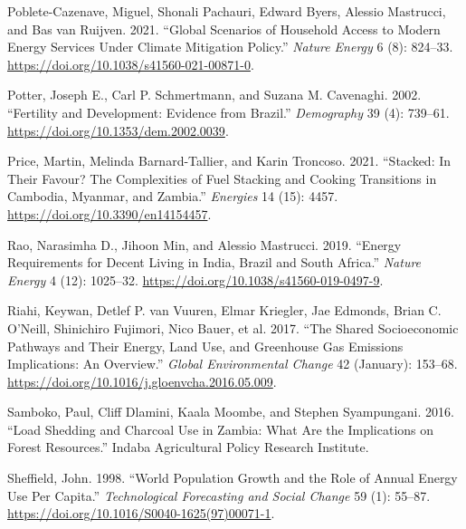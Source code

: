 \documentclass[
]{article}
\newlength{\cslhangindent}
\newlength{\cslentryspacingunit} %
\newenvironment{CSLReferences}[2] %
 {%
  \setlength{\parindent}{0pt}
  \ifodd #1
  \let\oldpar\par
  \def\par{\hangindent=\cslhangindent\oldpar}
  \fi
  \setlength{\parskip}{#2\cslentryspacingunit}
 }%
 {}
\begin{document}
\begin{CSLReferences}{1}{0}
\leavevmode{}%
Poblete-Cazenave, Miguel, Shonali Pachauri, Edward Byers, Alessio Mastrucci, and Bas van Ruijven. 2021. {``Global Scenarios of Household Access to Modern Energy Services Under Climate Mitigation Policy.''} \emph{Nature Energy} 6 (8): 824--33. \url{https://doi.org/10.1038/s41560-021-00871-0}.

\leavevmode{}%
Potter, Joseph E., Carl P. Schmertmann, and Suzana M. Cavenaghi. 2002. {``Fertility and Development: Evidence from {Brazil}.''} \emph{Demography} 39 (4): 739--61. \url{https://doi.org/10.1353/dem.2002.0039}.

\leavevmode{}%
Price, Martin, Melinda Barnard-Tallier, and Karin Troncoso. 2021. {``Stacked: {In} {Their} {Favour}? {The} {Complexities} of {Fuel} {Stacking} and {Cooking} {Transitions} in {Cambodia}, {Myanmar}, and {Zambia}.''} \emph{Energies} 14 (15): 4457. \url{https://doi.org/10.3390/en14154457}.

\leavevmode{}%
Rao, Narasimha D., Jihoon Min, and Alessio Mastrucci. 2019. {``Energy Requirements for Decent Living in {India}, {Brazil} and {South} {Africa}.''} \emph{Nature Energy} 4 (12): 1025--32. \url{https://doi.org/10.1038/s41560-019-0497-9}.

\leavevmode{}%
Riahi, Keywan, Detlef P. van Vuuren, Elmar Kriegler, Jae Edmonds, Brian C. O'Neill, Shinichiro Fujimori, Nico Bauer, et al. 2017. {``The {Shared} {Socioeconomic} {Pathways} and Their Energy, Land Use, and Greenhouse Gas Emissions Implications: {An} Overview.''} \emph{Global Environmental Change} 42 (January): 153--68. \url{https://doi.org/10.1016/j.gloenvcha.2016.05.009}.

\leavevmode{}%
Samboko, Paul, Cliff Dlamini, Kaala Moombe, and Stephen Syampungani. 2016. {``Load Shedding and Charcoal Use in {Zambia}: {What} Are the Implications on Forest Resources.''} Indaba Agricultural Policy Research Institute.

\leavevmode{}%
Sheffield, John. 1998. {``World {Population} {Growth} and the {Role} of {Annual} {Energy} {Use} Per {Capita}.''} \emph{Technological Forecasting and Social Change} 59 (1): 55--87. \url{https://doi.org/10.1016/S0040-1625(97)00071-1}.


\end{CSLReferences}
\end{document}
